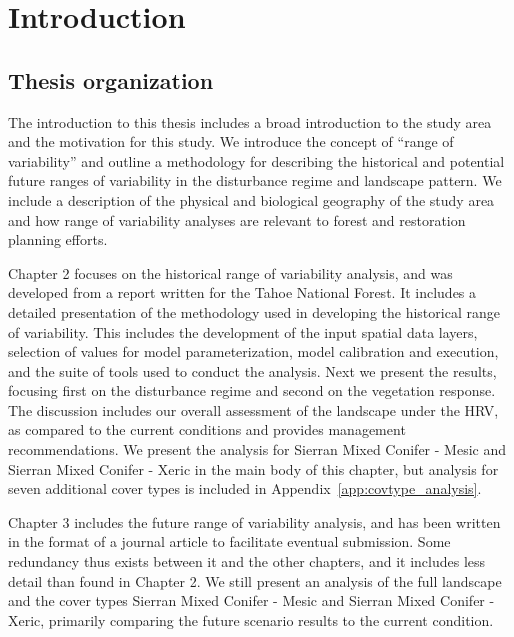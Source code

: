 
\chapter{Introduction} %

\section{Thesis organization}

The introduction to this thesis includes a broad introduction to the study area and the motivation for this study. We introduce the concept of ``range of variability'' and outline a methodology for describing the historical and potential future ranges of variability in the disturbance regime and landscape pattern. We include a description of the physical and biological geography of the study area and how range of variability analyses are relevant to forest and restoration planning efforts. 

Chapter 2 focuses on the historical range of variability analysis, and was developed from a report written for the Tahoe National Forest. It includes a detailed presentation of the methodology used in developing the historical range of variability. This includes the development of the input spatial data layers, selection of values for model parameterization, model calibration and execution, and the suite of tools used to conduct the analysis. Next we present the results, focusing first on the disturbance regime and second on the vegetation response. The discussion includes our overall assessment of the landscape under the HRV, as compared to the current conditions and provides management recommendations. We present the analysis for Sierran Mixed Conifer - Mesic and Sierran Mixed Conifer - Xeric in the main body of this chapter, but analysis for seven additional cover types is included in Appendix~\ref{app:covtype_analysis}.

Chapter 3 includes the future range of variability analysis, and has been written in the format of a journal article to facilitate eventual submission. Some redundancy thus exists between it and the other chapters, and it includes less detail than found in Chapter 2. We still present an analysis of the full landscape and the cover types Sierran Mixed Conifer - Mesic and Sierran Mixed Conifer - Xeric, primarily comparing the future scenario results to the current condition.





